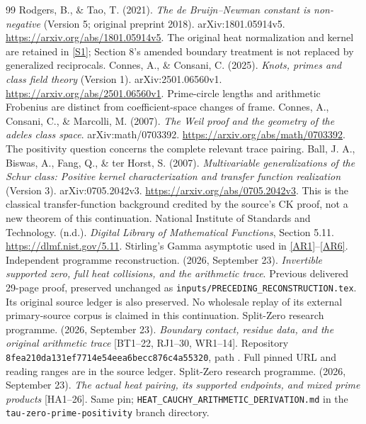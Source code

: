 \documentclass[11pt,a4paper]{article}
\theoremstyle{definition}\newtheorem{definition}[theorem]{Definition}
\newcommand{\pin}{\texttt{8fea210da131ef7714e54eea6becc876c4a55320}}
\begin{document}
\begin{thebibliography}{99}
 Rodgers, B., \& Tao, T. (2021). \emph{The de Bruijn--Newman constant is non-negative} (Version 5; original preprint 2018). arXiv:1801.05914v5. \url{https://arxiv.org/abs/1801.05914v5}. The original heat normalization and kernel are retained in \eqref{S1}; Section 8's amended boundary treatment is not replaced by generalized reciprocals.
 Connes, A., \& Consani, C. (2025). \emph{Knots, primes and class field theory} (Version 1). arXiv:2501.06560v1. \url{https://arxiv.org/abs/2501.06560v1}. Prime-circle lengths and arithmetic Frobenius are distinct from coefficient-space changes of frame.
 Connes, A., Consani, C., \& Marcolli, M. (2007). \emph{The Weil proof and the geometry of the adeles class space}. arXiv:math/0703392. \url{https://arxiv.org/abs/math/0703392}. The positivity question concerns the complete relevant trace pairing.
 Ball, J. A., Biswas, A., Fang, Q., \& ter Horst, S. (2007). \emph{Multivariable generalizations of the Schur class: Positive kernel characterization and transfer function realization} (Version 3). arXiv:0705.2042v3. \url{https://arxiv.org/abs/0705.2042v3}. This is the classical transfer-function background credited by the source's CK proof, not a new theorem of this continuation.
 National Institute of Standards and Technology. (n.d.). \emph{Digital Library of Mathematical Functions}, Section 5.11. \url{https://dlmf.nist.gov/5.11}. Stirling's Gamma asymptotic used in \eqref{AR1}--\eqref{AR6}.
 Independent programme reconstruction. (2026, September 23). \emph{Invertible supported zero, full heat collisions, and the arithmetic trace}. Previous delivered 29-page proof, preserved unchanged as \texttt{inputs/PRECEDING\_RECONSTRUCTION.tex}. Its original source ledger is also preserved. No wholesale replay of its external primary-source corpus is claimed in this continuation.
 Split-Zero research programme. (2026, September 23). \emph{Boundary contact, residue data, and the original arithmetic trace} [BT1--22, RJ1--30, WR1--14]. Repository \pin, path . Full pinned URL and reading ranges are in the source ledger.
 Split-Zero research programme. (2026, September 23). \emph{The actual heat pairing, its supported endpoints, and mixed prime products} [HA1--26]. Same pin; \texttt{HEAT\_CAUCHY\_ARITHMETIC\_DERIVATION.md} in the \texttt{tau-zero-prime-positivity} branch directory.

\end{thebibliography}
\end{document}
